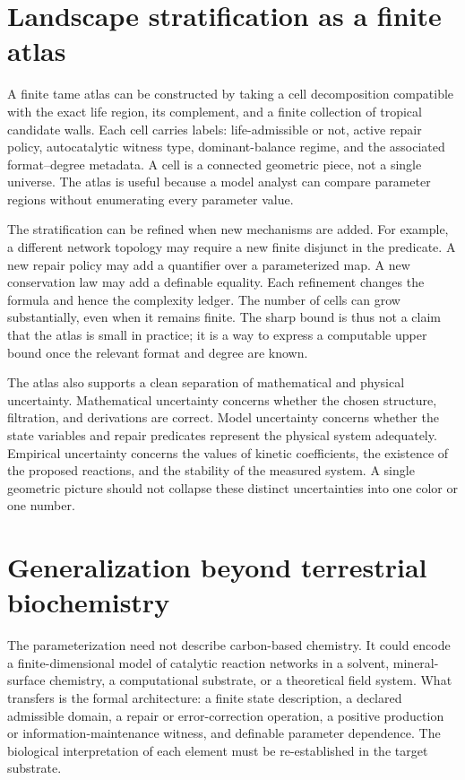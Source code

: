 \documentclass[11pt,a4paper]{article}
\theoremstyle{definition}
\theoremstyle{remark}
\begin{document}
\section{Landscape stratification as a finite atlas}
A finite tame atlas can be constructed by taking a cell decomposition compatible with the exact life region, its complement, and a finite collection of tropical candidate walls. Each cell carries labels: life-admissible or not, active repair policy, autocatalytic witness type, dominant-balance regime, and the associated format--degree metadata. A cell is a connected geometric piece, not a single universe. The atlas is useful because a model analyst can compare parameter regions without enumerating every parameter value.

The stratification can be refined when new mechanisms are added. For example, a different network topology may require a new finite disjunct in the predicate. A new repair policy may add a quantifier over a parameterized map. A new conservation law may add a definable equality. Each refinement changes the formula and hence the complexity ledger. The number of cells can grow substantially, even when it remains finite. The sharp bound is thus not a claim that the atlas is small in practice; it is a way to express a computable upper bound once the relevant format and degree are known.

The atlas also supports a clean separation of mathematical and physical uncertainty. Mathematical uncertainty concerns whether the chosen structure, filtration, and derivations are correct. Model uncertainty concerns whether the state variables and repair predicates represent the physical system adequately. Empirical uncertainty concerns the values of kinetic coefficients, the existence of the proposed reactions, and the stability of the measured system. A single geometric picture should not collapse these distinct uncertainties into one color or one number.


\section{Generalization beyond terrestrial biochemistry}
The parameterization need not describe carbon-based chemistry. It could encode a finite-dimensional model of catalytic reaction networks in a solvent, mineral-surface chemistry, a computational substrate, or a theoretical field system. What transfers is the formal architecture: a finite state description, a declared admissible domain, a repair or error-correction operation, a positive production or information-maintenance witness, and definable parameter dependence. The biological interpretation of each element must be re-established in the target substrate.
\end{document}
